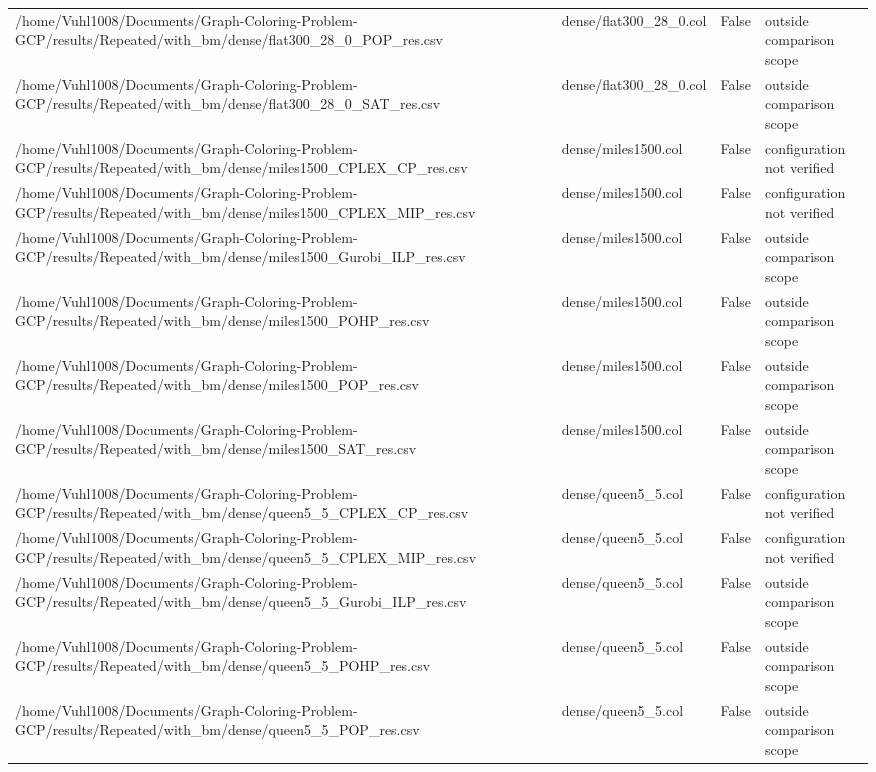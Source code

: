 \begin{table}[htbp]
\begin{tabular}{llll}
/home/Vuhl1008/Documents/Graph-Coloring-Problem-GCP/results/Repeated/with\_bm/dense/flat300\_28\_0\_POP\_res.csv & dense/flat300\_28\_0.col & False & outside comparison scope \\
/home/Vuhl1008/Documents/Graph-Coloring-Problem-GCP/results/Repeated/with\_bm/dense/flat300\_28\_0\_SAT\_res.csv & dense/flat300\_28\_0.col & False & outside comparison scope \\
/home/Vuhl1008/Documents/Graph-Coloring-Problem-GCP/results/Repeated/with\_bm/dense/miles1500\_CPLEX\_CP\_res.csv & dense/miles1500.col & False & configuration not verified \\
/home/Vuhl1008/Documents/Graph-Coloring-Problem-GCP/results/Repeated/with\_bm/dense/miles1500\_CPLEX\_MIP\_res.csv & dense/miles1500.col & False & configuration not verified \\
/home/Vuhl1008/Documents/Graph-Coloring-Problem-GCP/results/Repeated/with\_bm/dense/miles1500\_Gurobi\_ILP\_res.csv & dense/miles1500.col & False & outside comparison scope \\
/home/Vuhl1008/Documents/Graph-Coloring-Problem-GCP/results/Repeated/with\_bm/dense/miles1500\_POHP\_res.csv & dense/miles1500.col & False & outside comparison scope \\
/home/Vuhl1008/Documents/Graph-Coloring-Problem-GCP/results/Repeated/with\_bm/dense/miles1500\_POP\_res.csv & dense/miles1500.col & False & outside comparison scope \\
/home/Vuhl1008/Documents/Graph-Coloring-Problem-GCP/results/Repeated/with\_bm/dense/miles1500\_SAT\_res.csv & dense/miles1500.col & False & outside comparison scope \\
/home/Vuhl1008/Documents/Graph-Coloring-Problem-GCP/results/Repeated/with\_bm/dense/queen5\_5\_CPLEX\_CP\_res.csv & dense/queen5\_5.col & False & configuration not verified \\
/home/Vuhl1008/Documents/Graph-Coloring-Problem-GCP/results/Repeated/with\_bm/dense/queen5\_5\_CPLEX\_MIP\_res.csv & dense/queen5\_5.col & False & configuration not verified \\
/home/Vuhl1008/Documents/Graph-Coloring-Problem-GCP/results/Repeated/with\_bm/dense/queen5\_5\_Gurobi\_ILP\_res.csv & dense/queen5\_5.col & False & outside comparison scope \\
/home/Vuhl1008/Documents/Graph-Coloring-Problem-GCP/results/Repeated/with\_bm/dense/queen5\_5\_POHP\_res.csv & dense/queen5\_5.col & False & outside comparison scope \\
/home/Vuhl1008/Documents/Graph-Coloring-Problem-GCP/results/Repeated/with\_bm/dense/queen5\_5\_POP\_res.csv & dense/queen5\_5.col & False & outside comparison scope \\

\end{tabular}
\end{table}
